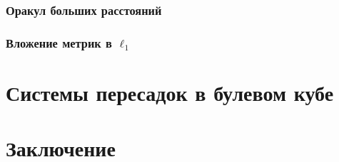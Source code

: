 \documentclass[12pt]{article}
\begin{document}
    \subsubsection{Оракул больших расстояний}
    \label{subsubsection_distance_oracle}
    \subsubsection{Вложение метрик в $\ell_1$}
    \label{subsubsection_metric_embeddings}
    \section{Системы пересадок в булевом кубе}
    \label{section_hub_labels}
    \section{Заключение}
    
    
\end{document}
